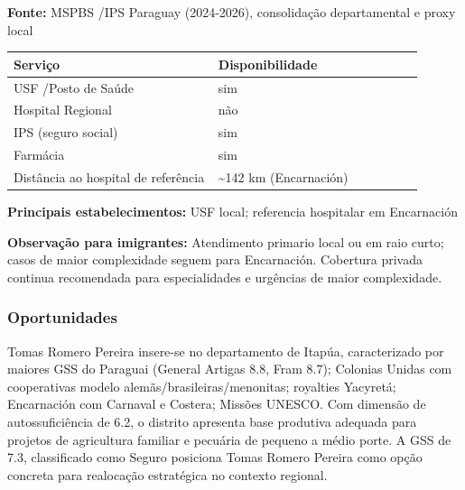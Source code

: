 \textbf{Fonte:} MSPBS /\allowbreak  IPS Paraguay (2024-2026), consolidação
departamental e proxy local

{\def\LTcaptype{none} %
\begin{longtable}{@{}>{\raggedright\arraybackslash}p{0.45\linewidth} >{\raggedright\arraybackslash}p{0.45\linewidth}@{}}
\toprule\noalign{}
Serviço & Disponibilidade \\
\midrule\noalign{}
\endhead
\bottomrule\noalign{}
\endlastfoot
USF /\allowbreak  Posto de Saúde & sim \\
Hospital Regional & não \\
IPS (seguro social) & sim \\
Farmácia & sim \\
Distância ao hospital de referência & \textasciitilde142 km
(Encarnación) \\
\end{longtable}
}

\textbf{Principais estabelecimentos:} USF local; referencia hospitalar
em Encarnación

\textbf{Observação para imigrantes:} Atendimento primario local ou em
raio curto; casos de maior complexidade seguem para Encarnación.
Cobertura privada continua recomendada para especialidades e urgências
de maior complexidade.
\newpage

\subsubsection*{Oportunidades}\label{oport-tomas-romero-pereira-0724}
Tomas Romero Pereira insere-se no departamento de Itapúa, caracterizado por maiores GSS do Paraguai (General Artigas 8.8, Fram 8.7); Colonias Unidas com cooperativas modelo alemãs/brasileiras/menonitas; royalties Yacyretá; Encarnación com Carnaval e Costera; Missões UNESCO. Com dimensão de autossuficiência de 6.2, o distrito apresenta base produtiva adequada para projetos de agricultura familiar e pecuária de pequeno a médio porte. A GSS de 7.3, classificado como Seguro posiciona Tomas Romero Pereira como opção concreta para realocação estratégica no contexto regional.

